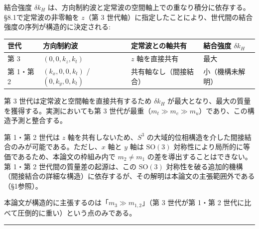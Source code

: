 \documentclass[
  a4paper,11pt]{ltjsarticle}
\newcounter{none}
\theoremstyle{definition}
\theoremstyle{remark}
\begin{document}
結合強度 \(\delta k_H\)
は、方向制約波と定常波の空間軸上での重なり積分に依存する。§8.1で定常波の非零軸を
\(z\)（第 3
世代軸）に指定したことにより、世代間の結合強度の序列が構造的に決定される:

{\def\LTcaptype{none} %
\begin{longtable}[]{@{}
  >{\raggedright\arraybackslash}p{}
  >{\raggedright\arraybackslash}p{}
  >{\raggedright\arraybackslash}p{}
  >{\raggedright\arraybackslash}p{}@{}}
\toprule\noalign{}
\begin{minipage}[b]{\linewidth}\raggedright
世代
\end{minipage} & \begin{minipage}[b]{\linewidth}\raggedright
方向制約波
\end{minipage} & \begin{minipage}[b]{\linewidth}\raggedright
定常波との軸共有
\end{minipage} & \begin{minipage}[b]{\linewidth}\raggedright
結合強度 \(\delta k_H\)
\end{minipage} \\
\midrule\noalign{}
\endhead
\bottomrule\noalign{}
\endlastfoot
第 3 & \((0, 0, k_z, k_t)\) & \(z\) 軸を直接共有 & 最大 \\
第 1・第 2 & \((k_x, 0, 0, k_t)\) / \((0, k_y, 0, k_t)\) &
共有軸なし（間接結合） & 小（機構未解明） \\
\end{longtable}
}

第 3 世代は定常波と空間軸を直接共有するため \(\delta k_H\)
が最大となり、最大の質量を獲得する。実測においても第 3
世代が最重（\(m_t \gg m_c \gg m_u\)）であり、この構造予測と整合する。

第 1・第 2 世代は \(z\) 軸を共有しないため、\(S^3\)
の大域的位相構造を介した間接結合のみが可能である。ただし、\(x\) 軸と
\(y\) 軸は \(\mathrm{SO}(3)\)
対称性により局所的に等価であるため、本論文の枠組み内で \(m_2 \neq m_1\)
の差を導出することはできない。第 1・第 2 世代間の質量差の起源は、この
\(\mathrm{SO}(3)\)
対称性を破る追加的機構（間接結合の詳細な構造）に依存するが、その解明は本論文の主張範囲外である（§1参照）。

本論文が構造的に主張するのは「\(m_3 \gg m_{1,2}\)」（第 3 世代が第 1・第
2 世代に比べて圧倒的に重い）という点のみである。

\begin{center}\rule{0.5\linewidth}{0.5pt}\end{center}
\end{document}
